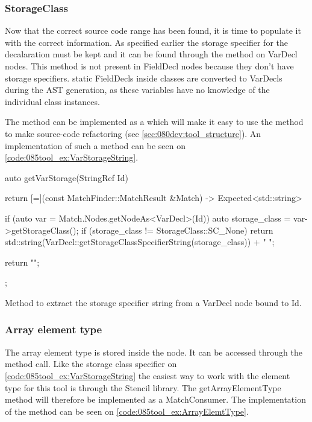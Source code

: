 \subsubsection*{StorageClass}
Now that the correct source code range has been found, it is time to populate it with the correct information. As specified earlier the storage specifier for the decalaration must be kept and it can be found through the  method on VarDecl nodes. This method is not present in FieldDecl nodes because they don't have storage specifiers. static FieldDecls inside classes are converted to VarDecls during the AST generation, as these variables have no knowledge of the individual class instances. 

The  method can be implemented as a  which will make it easy to use the method to make source-code refactoring (see \cref{sec:080dev:tool_structure}). An implementation of such a method can be seen on \cref{code:085tool_ex:VarStorageString}.

\begin{listing}[H]
    \begin{cppcode}
auto getVarStorage(StringRef Id) {
    return [=](const MatchFinder::MatchResult &Match) -> Expected<std::string> {
        if (auto var = Match.Nodes.getNodeAs<VarDecl>(Id)) {
            auto storage_class = var->getStorageClass();
            if (storage_class != StorageClass::SC_None) {
               return std::string(VarDecl::getStorageClassSpecifierString(storage_class)) + " ";
            }
        }

        return "";
    };
}
    \end{cppcode}
    \caption{Method to extract the storage specifier string from a VarDecl node bound to Id.}
    \label{code:085tool_ex:VarStorageString}
\end{listing}

\subsubsection*{Array element type}

The array element type is stored inside the  node. It can be accessed through the  method call. Like the storage class specifier on \cref{code:085tool_ex:VarStorageString} the easiest way to work with the element type for this tool is through the Stencil library. The getArrayElementType method will therefore be implemented as a MatchConsumer. The implementation of the method can be seen on \cref{code:085tool_ex:ArrayElemtType}. 


